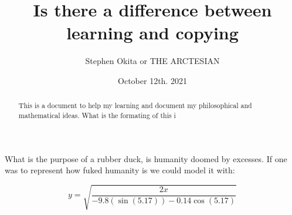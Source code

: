 \documentclass[12pt, letterpaper]{article}
\title{Is there a difference between learning and copying}
\author{Stephen Okita or THE ARCTESIAN}
\date{October 12th. 2021}
\begin{document}
\begin{titlepage}
    \maketitle
\end{titlepage}
\begin{abstract}
This is a document to help my learning and document my philosophical and mathematical ideas. What is the formating of this i
\end{abstract}

\begin{center}
What is the purpose of a rubber duck, is humanity doomed by excesses. If one was to represent how fuked humanity is we could model it with: 
\end{center}
\[ y = \sqrt{\frac{2x}{-9.8(\sin(5.17))-0.14\cos(5.17)}}\]
\end{document}
